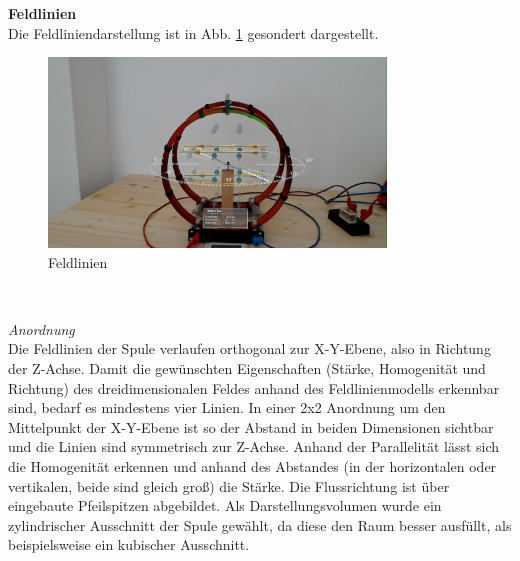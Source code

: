 \textbf{Feldlinien}\\
Die Feldliniendarstellung ist in Abb. \ref{img:mfield-lines} gesondert dargestellt.
\begin{figure}[H]
	\centering
	\includegraphics[width=0.8\textwidth]{images/HL/fieldlines.jpg}
	\caption{Feldlinien}
	\label{img:mfield-lines}
\end{figure}
\vspace{4px}
\begin{center}
	\\
\end{center}
\vspace{6px}
\textit{Anordnung}\\
Die Feldlinien der Spule verlaufen orthogonal zur X-Y-Ebene, also in Richtung der Z-Achse. Damit die gewünschten Eigenschaften (Stärke, Homogenität und Richtung) des dreidimensionalen Feldes anhand des Feldlinienmodells erkennbar sind, bedarf es mindestens vier Linien. In einer 2x2 Anordnung um den Mittelpunkt der X-Y-Ebene ist so der Abstand in beiden Dimensionen sichtbar und die Linien sind symmetrisch zur Z-Achse. Anhand der Parallelität lässt sich die Homogenität erkennen und anhand des Abstandes (in der horizontalen oder vertikalen, beide sind gleich groß) die Stärke. Die Flussrichtung ist über eingebaute Pfeilspitzen abgebildet. Als Darstellungsvolumen wurde ein zylindrischer Ausschnitt der Spule gewählt, da diese den Raum besser ausfüllt, als beispielsweise ein kubischer Ausschnitt.\\


